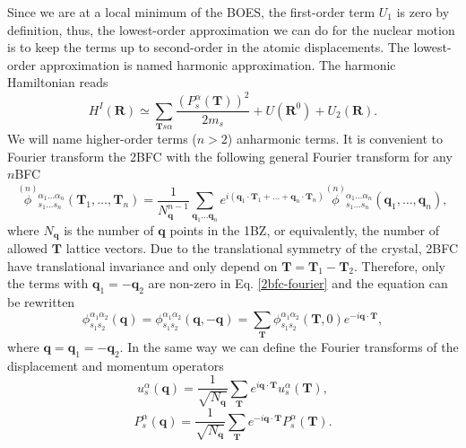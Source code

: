 Since we are at a local minimum of the BOES, the first-order term $U_{1}$ is zero by definition, thus, the lowest-order approximation we can do for the nuclear motion is to keep the terms up to second-order in the atomic 
displacements. The lowest-order approximation is named harmonic approximation. The harmonic Hamiltonian reads
\begin{equation}
\label{harmonic_hamiltonian}
 H^{I}(\mathbf{R})\simeq\sum_{\mathbf{T}s\alpha}\frac{(P_{s}^{\alpha}(\mathbf{T}))^{2}}{2m_{s}}+U(\mathbf{R}^{0})+U_{2}(\mathbf{R}).
\end{equation}
We will name higher-order terms ($n>2$) anharmonic terms. It is convenient to Fourier transform the 2BFC  with the following general Fourier transform for any $n$BFC
\begin{equation}
 \label{2bfc-fourier}
 \overset{(n)}{\phi}{}_{s_{1}\dots s_{n}}^{\alpha_{1}\dots\alpha_{n}}(\mathbf{T}_{1},\dots,\mathbf{T}_{n})=\frac{1}{N_{\mathbf{q}}^{n-1}}\sum_{\mathbf{q}_{1}\dots\mathbf{q}_{n}}e^{i(\mathbf{q}_{1}\cdot\mathbf{T}_{1}+\dots+\mathbf{q}_{
 n}\cdot\mathbf{T}_{n})}\overset{(n)}{\phi}{}_{s_{1}\dots s_{n}}^{\alpha_{1}\dots\alpha_{n}}(\mathbf{q}_{1},\dots,\mathbf{q}_{n}),
\end{equation}
where $N_{\mathbf{q}}$ is the number of $\mathbf{q}$ points in the 1BZ, or equivalently, the number of allowed $\mathbf{T}$ lattice vectors. Due to the translational symmetry of the crystal, 2BFC have translational invariance and only 
depend on $\mathbf{T}=\mathbf{T}_{1}-\mathbf{T}_{2}$. Therefore, only the terms with $\mathbf{q}_{1}=-\mathbf{q}_{2}$ are non-zero in 
Eq. \ref{2bfc-fourier} and the equation can be rewritten
\begin{equation}
 \label{2bfc-fourier-simple}
 \phi_{s_{1}s_{2}}^{\alpha_{1}\alpha_{2}}(\mathbf{q})=\phi_{s_{1}s_{2}}^{\alpha_{1}\alpha_{2}}(\mathbf{q},-\mathbf{q})=\sum_{\mathbf{T}}\phi_{s_{1}s_{2}}^{\alpha_{1}\alpha_{2}}(\mathbf{T},0)e^{-i\mathbf{
 q}\cdot\mathbf{T}},
\end{equation} 
where $\mathbf{q}=\mathbf{q}_{1}=-\mathbf{q}_{2}$. In the same way we can define the Fourier transforms of the displacement and momentum operators
\begin{equation}
 \label{displacement-fourier}
 u_{s}^{\alpha}(\mathbf{q})=\frac{1}{\sqrt{N_{\mathbf{q}}}}\sum_{\mathbf{T}}e^{i\mathbf{q}\cdot\mathbf{T}}u_{s}^{\alpha}(\mathbf{T}),
\end{equation}
\begin{equation}
 \label{momentum-fourier}
 P_{s}^{\alpha}(\mathbf{q})=\frac{1}{\sqrt{N_{\mathbf{q}}}}\sum_{\mathbf{T}}e^{-i\mathbf{q}\cdot\mathbf{T}}P_{s}^{\alpha}(\mathbf{T}).
\end{equation}
\\


